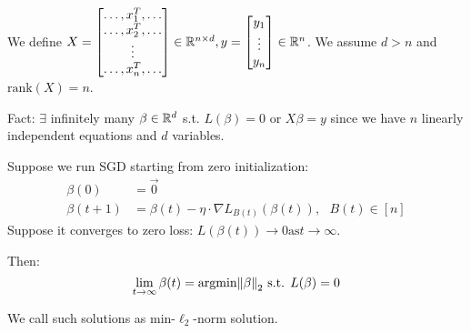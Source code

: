 We define \(X = \begin{bmatrix}
   \ldots, x_1^T, \ldots \\ 
   \ldots, x_2^T, \ldots \\ 
    \vdots \\ 
   \ldots, x_n^T, \ldots  
\end{bmatrix} \in \mathbb{R}^{n \times d}, y = \begin{bmatrix}
    y_1 \\  
    \vdots \\  
    y_n
\end{bmatrix} \in \mathbb{R}^n\).  We assume \(d > n\) and \(\text{rank}(X) = n\). 


Fact: \(\exists\) infinitely many \(\beta \in \mathbb{R}^d\) s.t. \(L(\beta) = 0\) or \(X\beta = y\)
since we have \(n\) linearly independent equations and \(d\) variables. 

\begin{theorem}
    Suppose we run SGD starting from zero initialization: 
    \begin{align*}
        \beta(0) &= \vec{0} \\ 
        \beta(t+1) &= \beta(t) - \eta \cdot \nabla L_{B(t)} \left(\beta(t)\right), \ \ \ B(t) \in [n]
    \end{align*}
    Suppose it converges to zero loss: \(L\left( \beta(t)\right) \to 0 \text{as} t \to \infty\). 
    
    Then: \[
        \lim_{t \to \infty} \beta (t) = \text{argmin} \norm{\beta}_2 \text{ s.t. } L(\beta) = 0   
    \]
\end{theorem}

\begin{remark}
    We call such solutions as min-\(\ell_2\)-norm solution. 
\end{remark}

